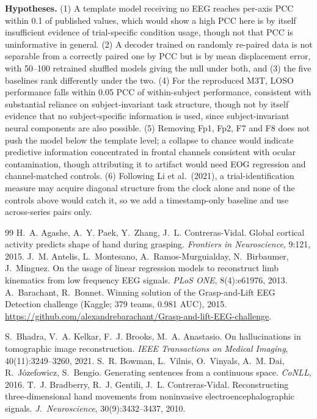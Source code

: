 \documentclass[11pt]{article}
\begin{document}
{\textbf{Hypotheses.} (1) A template model receiving no EEG reaches per-axis PCC within 0.1 of published values, which would show a high PCC here is by itself insufficient evidence of trial-specific condition usage, though not that PCC is uninformative in general. (2) A decoder trained on randomly re-paired data is not separable from a correctly paired one by PCC but is by mean displacement error, with 50--100 retrained shuffled models giving the null under both, and (3) the five baselines rank differently under the two. (4) For the reproduced M3T, LOSO performance falls within 0.05 PCC of within-subject performance, consistent with substantial reliance on subject-invariant task structure, though not by itself evidence that no subject-specific information is used, since subject-invariant neural components are also possible. (5) Removing Fp1, Fp2, F7 and F8 does not push the model below the template level; a collapse to chance would indicate predictive information concentrated in frontal channels consistent with ocular contamination, though attributing it to artifact would need EOG regression and channel-matched controls. (6) Following Li et al.~(2021), a trial-identification measure may acquire diagonal structure from the clock alone and none of the controls above would catch it, so we add a timestamp-only baseline and use across-series pairs only.\par}\begin{thebibliography}{99}\small
{} H.~A. Agashe, A.~Y. Paek, Y.~Zhang, J.~L. Contreras-Vidal. Global cortical activity predicts shape of hand during grasping. \emph{Frontiers in Neuroscience}, 9:121, 2015.
 J.~M. Antelis, L.~Montesano, A.~Ramos-Murguialday, N.~Birbaumer, J.~Minguez. On the usage of linear regression models to reconstruct limb kinematics from low frequency EEG signals. \emph{PLoS ONE}, 8(4):e61976, 2013.
 A.~Barachant, R.~Bonnet. Winning solution of the Grasp-and-Lift EEG Detection challenge (Kaggle; 379 teams, 0.981 AUC), 2015. \url{https://github.com/alexandrebarachant/Grasp-and-lift-EEG-challenge}.

 S.~Bhadra, V.~A. Kelkar, F.~J. Brooks, M.~A. Anastasio. On hallucinations in tomographic image reconstruction. \emph{IEEE Transactions on Medical Imaging}, 40(11):3249--3260, 2021.
 S.~R. Bowman, L.~Vilnis, O.~Vinyals, A.~M. Dai, R.~J\'ozefowicz, S.~Bengio. Generating sentences from a continuous space. \emph{CoNLL}, 2016.
 T.~J. Bradberry, R.~J. Gentili, J.~L. Contreras-Vidal. Reconstructing three-dimensional hand movements from noninvasive electroencephalographic signals. \emph{J.\ Neuroscience}, 30(9):3432--3437, 2010.


\end{thebibliography}
\end{document}

